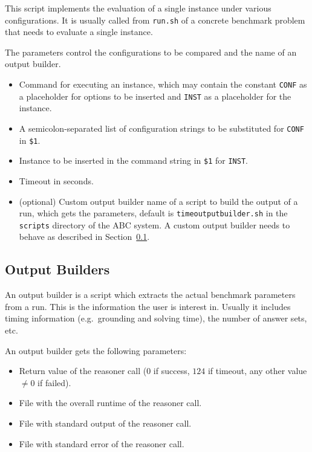 \documentclass[a4paper]{article}
\newcommand{\abcs}{{ABC}}
\begin{document}
		    This script implements the evaluation of
		    a single instance under various configurations.
		    It is usually called from {\tt run.sh} of a concrete benchmark problem
		    that needs to evaluate a single instance.
		
		    The parameters control the configurations to be compared
		    and the name of an output builder.
		
		    \medskip{}
		    \begin{itemize}
				\item[{\tt \$1}:] Command for executing an instance, which may contain the constant {\tt CONF} as a placeholder
					for options to be inserted and {\tt INST} as a placeholder for the instance.
				\item[{\tt \$2}:] A semicolon-separated list of configuration strings to be substituted for {\tt CONF} in {\tt \$1}.
				\item[{\tt \$3}:] Instance to be inserted in the command string in {\tt \$1} for {\tt INST}.
				\item[{\tt \$4}:] Timeout in seconds.
				\item[{\tt \$5}:] (optional) Custom output builder name of a script to build the output of a run, which gets the parameters, default is {\tt timeoutputbuilder.sh}
					in the {\tt scripts} directory of the \abcs{} system. A custom output builder needs to behave as described in Section~\ref{sec:architecture:outputbuilder}.
		    \end{itemize}
	
		\subsection{Output Builders}
		\label{sec:architecture:outputbuilder}
				
			An output builder is a script which extracts the actual benchmark parameters
			from a run. This is the information the user is interest in. Usually it
			includes timing information (e.g.~grounding and solving time), the number of answer sets, etc.
			
			An output builder gets the following parameters:
			    \begin{itemize}
					\item[{\tt \$1}:] Return value of the reasoner call ($0$ if success, $124$ if timeout, any other value $\not= 0$ if failed).
					\item[{\tt \$2}:] File with the overall runtime of the reasoner call.
					\item[{\tt \$3}:] File with standard output of the reasoner call.
					\item[{\tt \$4}:] File with standard error of the reasoner call.
			    \end{itemize}
			
\end{document}

